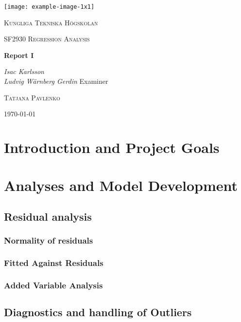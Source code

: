 \documentclass[11pt]{article}
\author{Ludde}
\date{\today}
\title{}
\begin{document}
\begin{titlepage}
\centering
\texttt{[image: example-image-1x1]}\par\vspace{1cm}
{\scshape\LARGE Kungliga Tekniska Högskolan \par}
\vspace{1cm}
{\scshape\Large SF2930 Regression Analysis \par}
\vspace{1.5cm}
{\huge\bfseries Report I \\  \par}
\vspace{2cm}
{\Large\itshape Isac Karlsson\\ Ludvig Wärnberg Gerdin}
\vfill
Examiner \par
\textsc{Tatjana Pavlenko}

\vfill

{\large \today\par}
\end{titlepage}

\newpage
\tableofcontents
\newpage

\section{Introduction and Project Goals}
\label{sec:org0ffff59}
\section{Analyses and Model Development}
\label{sec:orga3ceb6c}
\subsection{Residual analysis}
\label{sec:org82a149b}
\subsubsection{Normality of residuals}
\label{sec:org21a291d}
\subsubsection{Fitted Against Residuals}
\label{sec:org5071a4a}
\subsubsection{Added Variable Analysis}
\label{sec:org84193a8}
\subsection{Diagnostics and handling of Outliers}
\label{sec:org74064fc}
\end{document}
